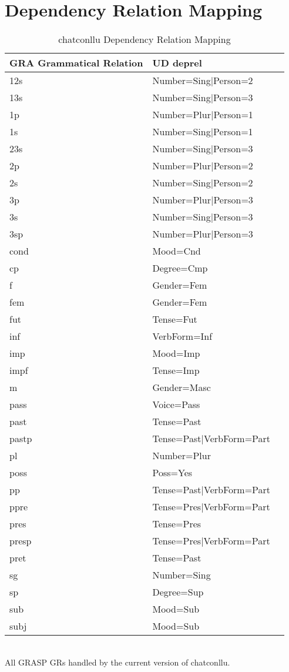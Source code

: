\newpage
\section{Dependency Relation Mapping}
\begin{table}[h!]
\caption {chatconllu Dependency Relation Mapping} \label{tab:grmap}
\centering
\begin{tabularx}{\linewidth}{@{}lXl@{}}
\toprule
\textbf{GRA Grammatical Relation} & \textbf{UD deprel}\\ \midrule
    12s & Number=Sing|Person=2\\
    13s & Number=Sing|Person=3\\
    1p & Number=Plur|Person=1\\
    1s & Number=Sing|Person=1\\
    23s & Number=Sing|Person=3\\
    2p & Number=Plur|Person=2\\
    2s & Number=Sing|Person=2\\
    3p & Number=Plur|Person=3\\
    3s & Number=Sing|Person=3\\
    3sp & Number=Plur|Person=3\\
    cond & Mood=Cnd\\
    cp & Degree=Cmp\\
    f & Gender=Fem\\
    fem & Gender=Fem\\
    fut & Tense=Fut\\
    inf & VerbForm=Inf\\
    imp & Mood=Imp\\
    impf & Tense=Imp\\
    m & Gender=Masc\\
    pass & Voice=Pass\\
    past & Tense=Past\\
    pastp & Tense=Past|VerbForm=Part\\
    pl & Number=Plur\\
    poss & Poss=Yes\\
    pp & Tense=Past|VerbForm=Part\\
    ppre & Tense=Pres|VerbForm=Part\\
    pres & Tense=Pres\\
    presp & Tense=Pres|VerbForm=Part\\
    pret & Tense=Past\\
    sg & Number=Sing\\
    sp & Degree=Sup\\
    sub & Mood=Sub\\
    subj & Mood=Sub\\\bottomrule
\end{tabularx}\\
\vspace{0.5cm}
All GRASP GRs handled by the current version of chatconllu.\\
\end{table}
